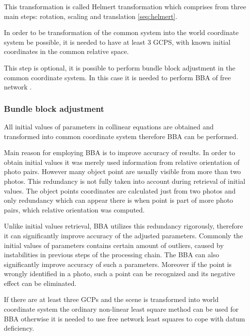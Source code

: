 \documentclass[a4paper,12pt]{article}
\begin{document}

This transformation is called Helmert  transformation which comprises from 
three main steps: rotation, scaling and translation \ref{seq:helmert}.

In order to be transformation of the common system into the world coordinate system be possible, it is needed 
to have at least 3 GCPS, with known initial coordinates in the common relative space. 
 
This step is optional, it is possible to perform bundle block adjustment in the common coordinate system. In this 
case it is needed to perform BBA of free network \label{sec:free_net_least}. 

\subsubsection{Bundle block adjustment}

All initial values of parameters in collinear equations are obtained and transformed into common coordinate system therefore 
BBA can be performed.

Main reason for employing BBA is to improve accuracy of results.
In order to obtain initial values it was merely used information from relative orientation of photo pairs.
However many object point are usually visible from more than two photos. This redundancy is not fully taken 
into account during retrieval of initial values. The object points coordinates are calculated 
just from two photos and only redundancy which can appear there is when point is part of more 
photo pairs, which relative orientation was computed. 


Unlike initial values retrieval, BBA utilizes this redundancy rigorously, therefore 
it can significantly improve accuracy of the adjusted parameters.
Commonly the initial values of parameters contains certain amount of outliers, caused by instabilities in previous steps of the processing chain.
The BBA can also significantly improve accuracy of such a parameters.
Moreover if the point is wrongly identified in a photo, such a point can be recognized and its 
negative effect can be eliminated.

If  there are at least three GCPs and the scene is transformed into world coordinate system the ordinary non-linear least square method \label{sec:non_least} 
can be used for BBA otherwise
it is needed to use free network least squares \label{sec:free_net_least} to cope with datum deficiency. 
\end{document}
